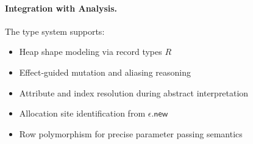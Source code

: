 \paragraph{Integration with Analysis.}  
The type system supports:
\begin{itemize}
\item Heap shape modeling via record types $R$
\item Effect‐guided mutation and aliasing reasoning
\item Attribute and index resolution during abstract interpretation
\item Allocation site identification from $\epsilon.\mathsf{new}$
\item Row polymorphism for precise parameter passing semantics
\end{itemize}
